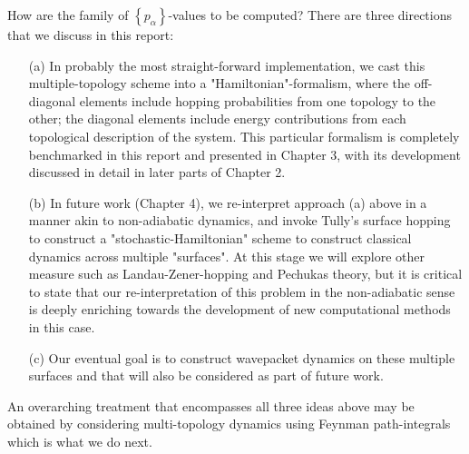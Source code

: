 How are the family of $\left\{p_\alpha\right\}$-values to be computed? 
There are three directions that we discuss in this report: 
\begin{itemize}
\item[(a)] In probably the most straight-forward implementation, we cast this
multiple-topology scheme into a "Hamiltonian"-formalism, where the off-diagonal
elements include hopping probabilities from one topology to the other; the
diagonal elements include energy contributions from each topological description
of the system. This particular formalism is completely benchmarked in this report
and presented in Chapter 3, with its development discussed in detail in later
parts of Chapter 2.
\item[(b)] In future work (Chapter 4), we re-interpret approach (a) above in a
manner akin to non-adiabatic dynamics, and invoke Tully's surface hopping
\cite{tully1971trajectory} to construct a "stochastic-Hamiltonian" scheme to
construct classical dynamics across multiple "surfaces". At this stage we will
explore other measure such as Landau-Zener-hopping and Pechukas theory, but it
is critical to state that our re-interpretation of this problem in the
non-adiabatic sense is deeply enriching towards the development of new
computational methods in this case.
\item[(c)] Our eventual goal is to construct wavepacket dynamics on these
multiple surfaces and that will also be considered as part of future work.
\end{itemize}
An overarching treatment that encompasses all three ideas above may be
obtained by considering multi-topology dynamics using Feynman path-integrals
\cite{feynman2010quantum} which is what we do next. 

